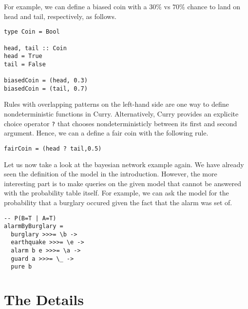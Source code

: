 \documentclass[
12pt, %
a4paper, %
oneside, %
]{llncs}
\newcommand{\code}[1]{{\texttt{#1}}}
\begin{document}
For example, we can define a biased coin with a $30\%$ vs $70\%$
chance to land on head and tail, respectively, as follows. %

\begin{verbatim}
type Coin = Bool

head, tail :: Coin
head = True
tail = False

biasedCoin = (head, 0.3)
biasedCoin = (tail, 0.7)
\end{verbatim}

Rules with overlapping patterns on the left-hand side are one way to
define nondeterministic functions in Curry. %
Alternatively, Curry provides an explicite choice operator \code{?}
that chooses nondeterministicly between its first and second
argument. %
Hence, we can a define a fair coin with the following rule. %

\begin{verbatim}
fairCoin = (head ? tail,0.5)
\end{verbatim}

Let us now take a look at the bayesian network example again. %
We have already seen the definition of the model in the
introduction. %
However, the more interesting part is to make queries on the given
model that cannot be answered with the probability table itself. %
For example, we can ask the model for the probability that a burglary
occured given the fact that the alarm was set of. %

\begin{verbatim}
-- P(B=T | A=T)
alarmByBurglary =
  burglary >>>= \b ->
  earthquake >>>= \e ->
  alarm b e >>>= \a ->
  guard a >>>= \_ ->
  pure b
\end{verbatim}

\section{The Details}
\end{document}
